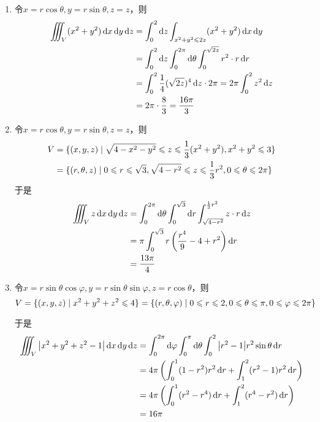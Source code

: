 \begin{solution}
    \begin{enumerate}
        \item 令$x=r \cos\theta, y = r \sin\theta, z = z$，则
        \begin{align*}
            \iiint_V (x^2 + y^2) \dif x \dif y \dif z 
            &= \int_0^2 \dif z \int_{x^2 + y^2 \les 2z} (x^2 + y^2) \dif x \dif y \\
            &= \int_0^2 \dif z \int_0^{2\pi} \dif \theta \int_0^{\sqrt{2z}} r^2 \cdot r \dif r \\
            &= \int_0^2 \frac{1}{4} (\sqrt{2z})^4 \dif z \cdot 2\pi = 2 \pi \int_0^2 z^2 \dif z \\
            &= 2 \pi \cdot \frac{8}{3} = \frac{16\pi}{3}
        \end{align*}
        \setcounter{enumi}{2}
        \item 令$x = r \cos\theta, y = r \sin\theta, z = z$，则
        \begin{align*}
            V &= \{ (x,y,z) \mid \sqrt{4-x^2 - y^2} \leqslant z \leqslant \frac{1}{3} (x^2 + y^2) , x^2 + y^2 \leqslant 3 \}\\
            &= \{ (r, \theta, z) \mid 0 \leqslant r \leqslant \sqrt 3, \sqrt{4 - r^2} \leqslant z \leqslant \frac{1}{3} r^2 , 0 \leqslant \theta \leqslant 2\pi \}
        \end{align*}
        于是
        \begin{align*}
            \iiint_V z \operatorname{d\!} x \operatorname{d\!} y \operatorname{d\!} z 
            &= \int_0^{2\pi} \operatorname{d\!} \theta \int_0^{\sqrt{3}} \operatorname{d\!} r \int_{\sqrt{4 - r^2}}^{\frac{1}{3} r^2} z \cdot r \operatorname{d\!} z \\
            &= \pi \int_0^{\sqrt 3} r \left( \frac{r^4}{9} - 4 + r^2 \right) \operatorname{d\!} r \\
            &= \frac{13 \pi}{4} 
        \end{align*}
        \setcounter{enumi}{5}
        \item 令$x = r \sin\theta \cos\varphi, y = r \sin\theta \sin\varphi, z = r \cos\theta$，则
        $$ V = \{ (x,y,z) \mid x^2 + y^2 + z^2 \leqslant 4 \} = \{ (r, \theta, \varphi) \mid 0 \leqslant r \leqslant 2, 0 \leqslant \theta \leqslant \pi, 0 \leqslant \varphi \leqslant 2\pi \} $$

        于是
        \begin{align*}
            \iiint_V \abs{x^2 + y^2 + z^2 - 1} \dif x \dif y \dif z 
            &= \int_0^{2\pi} \dif\varphi \int_0^{\pi} \dif\theta \int_0^2 \abs{r^2 - 1} r^2 \sin\theta \dif r \\
            &= 4\pi \left( \int_0^1 (1 - r^2) r^2 \dif r + \int_1^2 (r^2 - 1) r^2 \dif r \right) \\
            &= 4\pi \left( \int_0^1 (r^2 - r^4) \dif r + \int_1^2 (r^4 - r^2) \dif r \right) \\
            &= 16\pi
            \end{align*}
                    
    \end{enumerate}
\end{solution}

